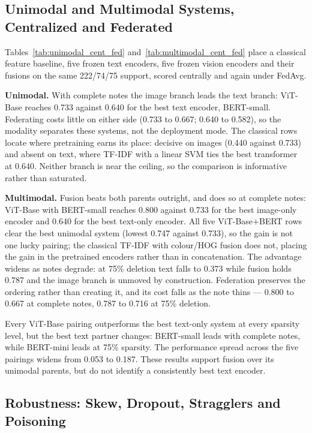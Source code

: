 \documentclass[conference]{IEEEtran}
\begin{document}
\subsection{Unimodal and Multimodal Systems, Centralized and Federated}




Tables~\ref{tab:unimodal_cent_fed} and~\ref{tab:multimodal_cent_fed} place a
classical feature baseline, five frozen text encoders, five frozen vision
encoders and their fusions on the same 222/74/75 support, scored centrally and
again under FedAvg.

\textbf{Unimodal.} With complete notes the image branch leads the text branch: ViT-Base reaches
0.733 against 0.640 for the best text encoder, BERT-small. Federating costs
little on either side (0.733 to 0.667; 0.640 to 0.582), so the modality
separates these systems, not the deployment mode. The classical rows locate
where pretraining earns its place: decisive on images (0.440 against 0.733) and
absent on text, where TF-IDF with a linear SVM ties the best transformer at
0.640. Neither branch is near the
ceiling, so the comparison is informative rather than saturated.

\textbf{Multimodal.} Fusion beats both parents outright, and does so at complete notes:
ViT-Base with BERT-small reaches 0.800 against 0.733 for the best image-only
encoder and 0.640 for the best text-only encoder. All five ViT-Base$+$BERT rows clear the best
unimodal system (lowest 0.747 against 0.733), so the gain is not one lucky
pairing; the classical TF-IDF with colour/HOG fusion does not,
placing the gain in the pretrained encoders rather than in concatenation. The
advantage widens as notes degrade: at 75\% deletion text falls to 0.373 while
fusion holds 0.787 and the image branch is unmoved by construction. Federation preserves
the ordering rather than creating it, and its cost falls as the note thins ---
0.800 to 0.667 at complete notes, 0.787 to 0.716 at 75\% deletion.

Every ViT-Base pairing outperforms the best text-only system at every sparsity level,
but the best text partner changes: BERT-small leads with complete notes,
while BERT-mini leads at 75\% sparsity. The performance spread across the five
pairings widens from 0.053 to 0.187. These results support fusion over its
unimodal parents, but do not identify a consistently best text encoder.

\subsection{Robustness: Skew, Dropout, Stragglers and Poisoning}
\label{sec:robustness}
\end{document}
